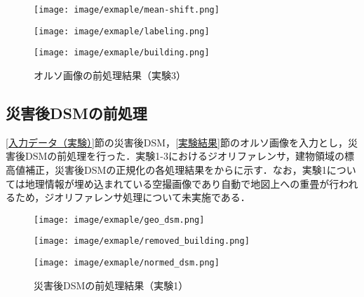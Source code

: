       \begin{figure}[t]
        \begin{minipage}[c]{0.329\hsize}
          \centering
          \texttt{[image: image/exmaple/mean-shift.png]}
        \end{minipage}
        \begin{minipage}[c]{0.329\hsize}
          \centering
          \texttt{[image: image/exmaple/labeling.png]}
        \end{minipage}
        \begin{minipage}[c]{0.329\hsize}
          \centering
          \texttt{[image: image/exmaple/building.png]}
        \end{minipage}
        \caption{オルソ画像の前処理結果（実験3）}
        \label{オルソ画像の前処理結果（実験3）}
      \end{figure}


    \subsection*{災害後DSMの前処理}
      \ref{入力データ（実験）}節の災害後DSM，\ref{実験結果}節のオルソ画像を入力とし，災害後DSMの前処理を行った．実験1-3におけるジオリファレンサ，建物領域の標高値補正，災害後DSMの正規化の各処理結果をからに示す．なお，実験1については地理情報が埋め込まれている空撮画像であり自動で地図上への重畳が行われるため，ジオリファレンサ処理について未実施である．

      \begin{figure}[t]
        \begin{minipage}[c]{0.329\hsize}
          \centering
          \texttt{[image: image/exmaple/geo\_dsm.png]}
        \end{minipage}
        \begin{minipage}[c]{0.329\hsize}
          \centering
          \texttt{[image: image/exmaple/removed\_building.png]}
        \end{minipage}
        \begin{minipage}[c]{0.329\hsize}
          \centering
          \texttt{[image: image/exmaple/normed\_dsm.png]}
        \end{minipage}
        \caption{災害後DSMの前処理結果（実験1）}
        \label{災害後DSMの前処理結果（実験1）}
      \end{figure}

